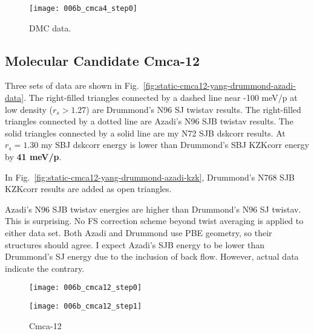 \begin{figure}[h]
\begin{minipage}{0.48\textwidth}
\texttt{[image: 006b\_cmca4\_step0]}
\caption{DMC data.\label{fig:static-cmca4-yang-drummond-azadi-data}}
\end{minipage}
\end{figure}

\subsection{Molecular Candidate Cmca-12}

Three sets of data are shown in Fig.~\ref{fig:static-cmca12-yang-drummond-azadi-data}. The right-filled triangles connected by a dashed line near -100 meV/p at low density ($r_s>1.27$) are Drummond's N96 SJ twistav results. The right-filled triangles connected by a dotted line are Azadi's N96 SJB twistav results. The solid triangles connected by a solid line are my N72 SJB dskcorr results. At $r_s=1.30$ my SBJ dskcorr energy is lower than Drummond's SBJ KZKcorr energy by \textbf{41 meV/p}.

In Fig.~\ref{fig:static-cmca12-yang-drummond-azadi-kzk}, Drummond's N768 SJB KZKcorr results are added as open triangles.

Azadi's N96 SJB twistav energies are higher than Drummond's N96 SJ twistav. This is surprising. No FS correction scheme beyond twist averaging is applied to either data set. Both Azadi and Drummond use PBE geometry, so their structures should agree. I expect Azadi's SJB energy to be lower than Drummond's SJ energy due to the inclusion of back flow. However, actual data indicate the contrary.

\begin{figure}[h]
\begin{minipage}{0.48\textwidth}
\texttt{[image: 006b\_cmca12\_step0]}
\end{minipage}
\begin{minipage}{0.48\textwidth}
\texttt{[image: 006b\_cmca12\_step1]}
\end{minipage}
\caption{Cmca-12\label{fig:static-cmca12-yang-drummond-azadi}}
\end{figure}

